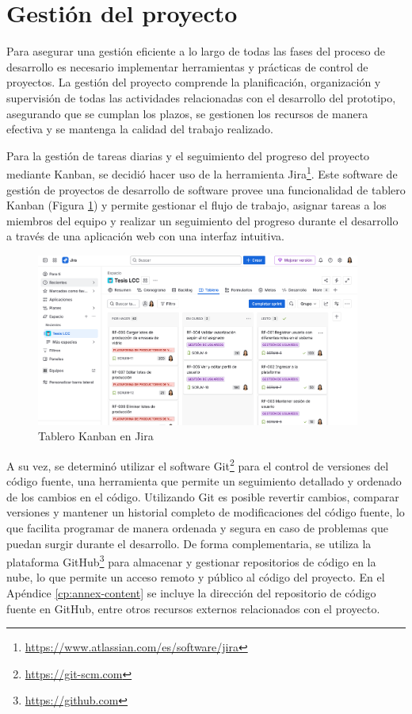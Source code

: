 \section{Gestión del proyecto}

Para asegurar una gestión eficiente a lo largo de todas las fases del proceso de desarrollo es necesario implementar herramientas y prácticas de control de proyectos. La gestión del proyecto comprende la planificación, organización y supervisión de todas las actividades relacionadas con el desarrollo del prototipo, asegurando que se cumplan los plazos, se gestionen los recursos de manera efectiva y se mantenga la calidad del trabajo realizado.

Para la gestión de tareas diarias y el seguimiento del progreso del proyecto mediante Kanban, se decidió hacer uso de la herramienta Jira\footnote{\url{https://www.atlassian.com/es/software/jira}}. Este \gls{software} de gestión de proyectos de desarrollo de software provee una funcionalidad de tablero Kanban (Figura \ref{fig:jira-kanban}) y permite gestionar el flujo de trabajo, asignar tareas a los miembros del equipo y realizar un seguimiento del progreso durante el desarrollo a través de una aplicación web con una interfaz intuitiva.

\begin{figure}[!b]
		\centering
		\includegraphics[width=0.95\textwidth]{Figures/jira-kanban.png}
		\caption{Tablero Kanban en Jira}
		\label{fig:jira-kanban}
\end{figure}

A su vez, se determinó utilizar el software Git\footnote{\url{https://git-scm.com}} para el control de versiones del código fuente, una herramienta que permite un seguimiento detallado y ordenado de los cambios en el código. Utilizando Git es posible revertir cambios, comparar versiones y mantener un historial completo de modificaciones del código fuente, lo que facilita programar de manera ordenada y segura en caso de problemas que puedan surgir durante el desarrollo. De forma complementaria, se utiliza la plataforma GitHub\footnote{\url{https://github.com}} para almacenar y gestionar repositorios de código en la nube, lo que permite un acceso remoto y público al código del proyecto. En el Apéndice \ref{cp:annex-content} se incluye la dirección del repositorio de código fuente en GitHub, entre otros recursos externos relacionados con el proyecto.

